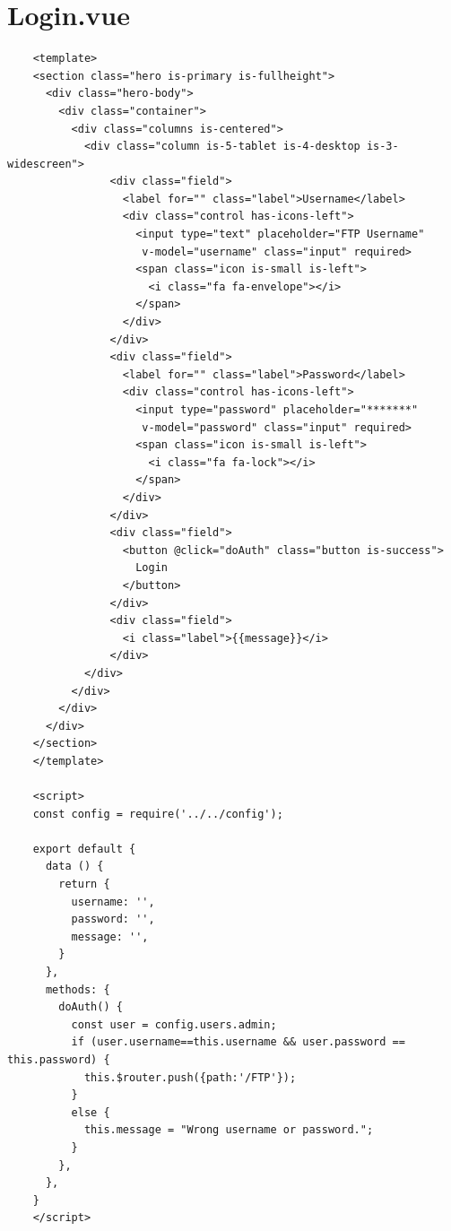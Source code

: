 \documentclass[12pt]{article}
\begin{document}
\section{Login.vue}
\begin{verbatim}
	<template>
	<section class="hero is-primary is-fullheight">
	  <div class="hero-body">
		<div class="container">
		  <div class="columns is-centered">
			<div class="column is-5-tablet is-4-desktop is-3-widescreen">
				<div class="field">
				  <label for="" class="label">Username</label>
				  <div class="control has-icons-left">
					<input type="text" placeholder="FTP Username"
					 v-model="username" class="input" required>
					<span class="icon is-small is-left">
					  <i class="fa fa-envelope"></i>
					</span>
				  </div>
				</div>
				<div class="field">
				  <label for="" class="label">Password</label>
				  <div class="control has-icons-left">
					<input type="password" placeholder="*******"
					 v-model="password" class="input" required>
					<span class="icon is-small is-left">
					  <i class="fa fa-lock"></i>
					</span>
				  </div>
				</div>
				<div class="field">
				  <button @click="doAuth" class="button is-success">
					Login
				  </button>
				</div>
				<div class="field">
				  <i class="label">{{message}}</i>
				</div>
			</div>
		  </div>
		</div>
	  </div>
	</section>
	</template>
	
	<script>
	const config = require('../../config');
	
	export default {
	  data () {
		return {
		  username: '',
		  password: '',
		  message: '',
		}
	  },
	  methods: {
		doAuth() {
		  const user = config.users.admin;
		  if (user.username==this.username && user.password == this.password) {
			this.$router.push({path:'/FTP'});
		  }
		  else {
			this.message = "Wrong username or password.";
		  }
		},
	  },
	}
	</script>
\end{verbatim}
\end{document}
